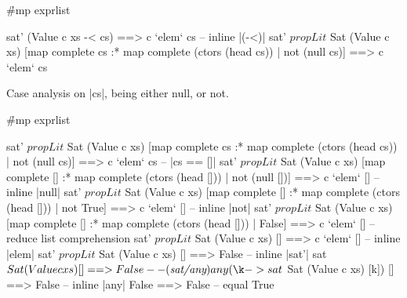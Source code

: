 \begin{comment}
\h{#mp exprlist}\begin{code}
sat $ Sat (Value c xs) [merge ms_1 ms_2 :* merge ms_1 ms_2] ==> sat $ Sat (Value c xs) [ms_1 :* ms_2]
    -- inline |sat|
sat' $ (c <| [merge ms_1 ms_2 :* merge ms_1 ms_2]) /# ([0..],xs) ==> sat' $ (c <| [ms_1 :* ms_2]) /# ([0..],xs)
    -- inline | <|| |
sat' $ propOrs (map f [merge ms_1 ms_2 :* merge ms_1 ms_2]) /# ([0..],xs) ==> sat' $ propOrs (map f [ms_1 :* ms_2]) /# ([0..],xs)
    -- inline |map|
sat' $ propOrs [f $ merge ms_1 ms_2 :* merge ms_1 ms_2] /# ([0..],xs) ==> sat' $ propOrs [f $ ms_1 :* ms_2] /# ([0..],xs)
    -- inline |propOrs|
sat' $ (f $ merge ms_1 ms_2 :* merge ms_1 ms_2) /# ([0..],xs) ==> sat' $ (f $ ms_1 :* ms_2) /# ([0..],xs)
    -- inline |f|
sat' $ propOrs [propAnds $ map propLit $ g vs_1 | Pattern c_1 vs_1 <- merge ms_1 ms_2, c_1 == c] /# ([0..],xs) ==> rhs
    -- \todo{finish proof, and change initial theorem}
\end{code}
\end{comment}





\h{#mp exprlist}\begin{code}
sat' (Value c xs -< cs) ==> c `elem` cs
    -- inline |(-<)|
sat' $ propLit $ Sat (Value c xs)
    [map complete cs :* map complete (ctors (head cs)) | not (null cs)] ==> c `elem` cs
\end{code}

Case analysis on |cs|, being either null, or not.

\h{#mp exprlist}\begin{code}
sat' $ propLit $ Sat (Value c xs)
    [map complete cs :* map complete (ctors (head cs)) | not (null cs)] ==> c `elem` cs
    -- |cs == []|
sat' $ propLit $ Sat (Value c xs)
    [map complete [] :* map complete (ctors (head [])) | not (null [])] ==> c `elem` []
    -- inline |null|
sat' $ propLit $ Sat (Value c xs)
    [map complete [] :* map complete (ctors (head [])) | not True] ==> c `elem` []
    -- inline |not|
sat' $ propLit $ Sat (Value c xs)
    [map complete [] :* map complete (ctors (head [])) | False] ==> c `elem` []
    -- reduce list comprehension
sat' $ propLit $ Sat (Value c xs) [] ==> c `elem` []
    -- inline |elem|
sat' $ propLit $ Sat (Value c xs) [] ==> False
    -- inline |sat'|
sat $ Sat (Value c xs) [] ==> False
    -- \lemma{sat/any}
any (\k -> sat $ Sat (Value c xs) [k]) [] ==> False
    -- inline |any|
False ==> False
    -- equal
True
\end{code}

